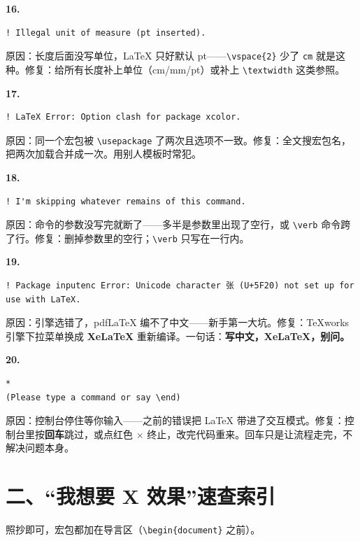 \textbf{16.}

\begin{lstlisting}
! Illegal unit of measure (pt inserted).
\end{lstlisting}

原因：长度后面没写单位，LaTeX 只好默认 pt——\texttt{\textbackslash{}vspace\{2\}} 少了 \texttt{cm} 就是这种。修复：给所有长度补上单位（cm/mm/pt）或补上 \texttt{\textbackslash{}textwidth} 这类参照。

\textbf{17.}

\begin{lstlisting}
! LaTeX Error: Option clash for package xcolor.
\end{lstlisting}

原因：同一个宏包被 \texttt{\textbackslash{}usepackage} 了两次且选项不一致。修复：全文搜宏包名，把两次加载合并成一次。用别人模板时常犯。

\textbf{18.}

\begin{lstlisting}
! I'm skipping whatever remains of this command.
\end{lstlisting}

原因：命令的参数没写完就断了——多半是参数里出现了空行，或 \texttt{\textbackslash{}verb} 命令跨了行。修复：删掉参数里的空行；\texttt{\textbackslash{}verb} 只写在一行内。

\textbf{19.}

\begin{lstlisting}
! Package inputenc Error: Unicode character 张 (U+5F20) not set up for use with LaTeX.
\end{lstlisting}

原因：引擎选错了，pdfLaTeX 编不了中文——新手第一大坑。修复：TeXworks 引擎下拉菜单换成 \textbf{XeLaTeX} 重新编译。一句话：\textbf{写中文，XeLaTeX，别问。}

\textbf{20.}

\begin{lstlisting}
*
(Please type a command or say \end)
\end{lstlisting}

原因：控制台停住等你输入——之前的错误把 LaTeX 带进了交互模式。修复：控制台里按\textbf{回车}跳过，或点红色 \ensuremath{\times} 终止，改完代码重来。回车只是让流程走完，不解决问题本身。

\section*{二、“我想要 X 效果”速查索引}

照抄即可，宏包都加在导言区（\texttt{\textbackslash{}begin\{document\}} 之前）。

